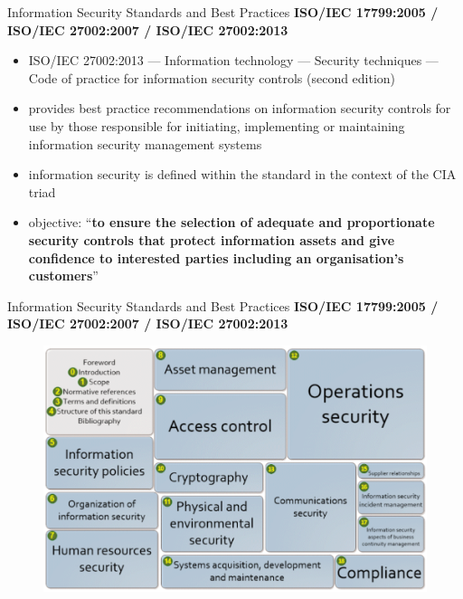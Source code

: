 \documentclass[pdf]{beamer}
\begin{document}
\begin{frame}{Information Security Standards and Best Practices}
\textbf{ISO/IEC 17799:2005 / ISO/IEC 27002:2007 / ISO/IEC 27002:2013}
\begin{itemize}
\item
ISO/IEC 27002:2013 — Information technology — Security techniques — Code of practice for information security controls (second edition) 

\item
provides best practice recommendations on information security controls for use by those responsible for initiating, implementing or maintaining information security management systems

\item
information security is defined within the standard in the context of the CIA triad

\item
objective: “\textbf{to ensure the selection of adequate and proportionate security controls that protect information assets and give confidence to interested parties including an organisation’s
customers}”

\end{itemize}
\end{frame}



\begin{frame}{Information Security Standards and Best Practices}
\textbf{ISO/IEC 17799:2005 / ISO/IEC 27002:2007 / ISO/IEC 27002:2013}
\begin{figure}[t]
\centering
\includegraphics[scale=0.5]{Images/ISOIEC270022013}
\end{figure}
\end{frame}
\end{document}
